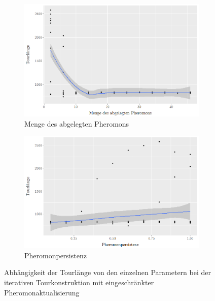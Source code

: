 \documentclass[doktyp=barbeit, sprache=german]{TUBAFarbeiten}
\begin{document}
\begin{figure}
\begin{subfigure}[b]{0.475\textwidth}
            \includegraphics[width=\textwidth]{images/diagrammmasdeposit}
            \caption{Menge des abgelegten Pheromons}   
            \label{fig:iterativeDeposit}
        \end{subfigure}
        \quad
        \begin{subfigure}[b]{0.475\textwidth}   
            \centering 
            \includegraphics[width=\textwidth]{images/diagrammmasreduction}
            \caption{Pheromonpersistenz}   
            \label{fig:iterativeReduction}
        \end{subfigure}
        \caption{Abhängigkeit der Tourlänge von den einzelnen Parametern bei der iterativen Tourkonstruktion mit eingeschränkter Pheromonaktualisierung } 
        \label{fig:mmasDiagram}
    \end{figure}
\end{document}
